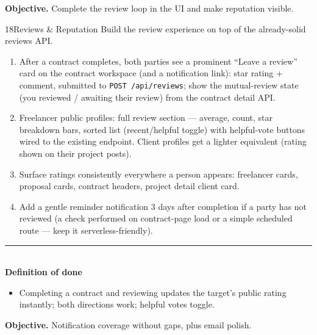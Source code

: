 \documentclass[11pt,a4paper]{article}
\newcommand{\dod}{\medskip\noindent\textcolor{donegreen}{\rule{\linewidth}{0.5pt}}\\[1mm]\textbf{\textcolor{donegreen}{Definition of done}}\\[-2mm]}
\newcommand{\objective}[1]{\noindent\textbf{Objective.} #1\medskip}
\begin{document}
\objective{Complete the review loop in the UI and make reputation visible.}

\begin{promptbox}{18}{Reviews \& Reputation}
Build the review experience on top of the already-solid reviews API.

\begin{enumerate}[leftmargin=1.6em]
  \item After a contract completes, both parties see a prominent ``Leave a review''
        card on the contract workspace (and a notification link): star rating +
        comment, submitted to \texttt{POST /api/reviews}; show the mutual-review
        state (you reviewed / awaiting their review) from the contract detail API.
  \item Freelancer public profiles: full review section --- average, count, star
        breakdown bars, sorted list (recent/helpful toggle) with helpful-vote buttons
        wired to the existing endpoint. Client profiles get a lighter equivalent
        (rating shown on their project posts).
  \item Surface ratings consistently everywhere a person appears: freelancer cards,
        proposal cards, contract headers, project detail client card.
  \item Add a gentle reminder notification 3 days after completion if a party has
        not reviewed (a check performed on contract-page load or a simple scheduled
        route --- keep it serverless-friendly).
\end{enumerate}

\dod
\begin{itemize}[leftmargin=1.6em]
  \item Completing a contract and reviewing updates the target's public rating
        instantly; both directions work; helpful votes toggle.
\end{itemize}
\end{promptbox}

\objective{Notification coverage without gaps, plus email polish.}
\end{document}
